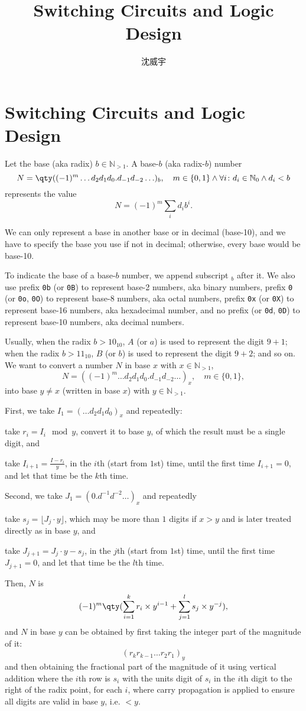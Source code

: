 \documentclass[a4paper,12pt]{report}
\begin{document}
\title{Switching Circuits and Logic Design}
\author{沈威宇}
\date{\temtoday}
\titletocdoc
\chapter{Switching Circuits and Logic Design}
Let the base (aka radix) $b\in\mathbb{N}_{>1}$. A base-$b$ (aka radix-$b$) number
\[N=\qty((-1)^m\ldots d_2d_1d_0.d_{-1}d_{-2}\ldots)_b,\quad m\in\{0,1\}\land\forall i\colon d_i\in\mathbb{N}_0\land d_i<b\]
represents the value
\[N =(-1)^m\sum_id_ib^i.\]

We can only represent a base in another base or in decimal (base-10), and we have to specify the base you use if not in decimal; otherwise, every base would be base-10.

To indicate the base of a base-$b$ number, we append subscript $_b$ after it. We also use prefix \verb|0b| (or \verb|0B|) to represent base-2 numbers, aka binary numbers, prefix \verb|0| (or \verb|0o|, \verb|0O|) to represent base-8 numbers, aka octal numbers, prefix \verb|0x| (or \verb|0X|) to represent base-16 numbers, aka hexadecimal number, and no prefix (or \verb|0d|, \verb|0D|) to represent base-10 numbers, aka decimal numbers.

Usually, when the radix $b>10_{10}$, $A$ (or $a$) is used to represent the digit $9+1$; when the radix $b>11_{10}$, $B$ (or $b$) is used to represent the digit $9+2$; and so on.
We want to convert a number $N$ in base $x$ with $x\in\mathbb{N}_{>1}$,
\[N=((-1)^m\ldots d_2d_1d_0.d_{-1}d_{-2}\ldots)_x,\quad m\in\{0,1\},\]
into base $y\neq x$ (written in base $x$) with $y\in\mathbb{N}_{>1}$.
\ben
\item First, we take $I_1=(\ldots d_2d_1d_0)_x$ and repeatedly:
\ben
\item take $r_i=I_i\mod y$, convert it to base $y$, of which the result must be a single digit, and
\item take $I_{i+1}=\frac{I-r_i}{y}$,
\een
in the $i$th (start from $1$st) time, until the first time $I_{i+1}=0$, and let that time be the $k$th time.
\item Second, we take $J_1=(0.d^{-1}d^{-2}\ldots)_x$ and repeatedly
\ben
\item take $s_j=\lfloor J_j\cdot y\rfloor$, which may be more than $1$ digits if $x>y$ and is later treated directly as in base $y$, and
\item take $J_{j+1}=J_j\cdot y-s_j$,
\een
in the $j$th (start from $1$st) time, until the first time $J_{j+1}=0$, and let that time be the $l$th time.
\item Then, $N$ is
\[(-1)^m\qty(\sum_{i=1}^kr_i\times y^{i-1}+\sum_{j=1}^ls_j\times y^{-j}),\]
and $N$ in base $y$ can be obtained by first taking the integer part of the magnitude of it:
\[(r_kr_{k-1}\ldots r_2r_1)_y\]
and then obtaining the fractional part of the magnitude of it using vertical addition where the $i$th row is $s_i$ with the units digit of $s_i$ in the $i$th digit to the right of the radix point, for each $i$, where carry propagation is applied to ensure all digits are valid in base $y$, i.e. $<y$.
\een
\end{document}
